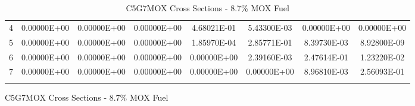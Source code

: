 \begin{figure}
\begin{table}[H]
\begin{subtable}[h]{1.0\textwidth}
{\begin{tabular}{*8c}
4 &	0.00000E+00 &	0.00000E+00 &	0.00000E+00	& 4.68021E-01	& 5.43300E-03	& 0.00000E+00	& 0.00000E+00 \\
5 &	0.00000E+00 &	0.00000E+00 &	0.00000E+00	& 1.85970E-04	& 2.85771E-01	& 8.39730E-03	& 8.92800E-09 \\
6 &	0.00000E+00 &	0.00000E+00 &	0.00000E+00	& 0.00000E+00	& 2.39160E-03	& 2.47614E-01	& 1.23220E-02 \\
7 &	0.00000E+00 &	0.00000E+00 &	0.00000E+00	& 0.00000E+00	& 0.00000E+00	& 8.96810E-03	& 2.56093E-01 \\
        \bottomrule
        & & & & & & & 
    \end{tabular}}
  \end{subtable}
  \caption{C5G7MOX Cross Sections - 8.7\% MOX Fuel}
\end{table}
\end{figure}

